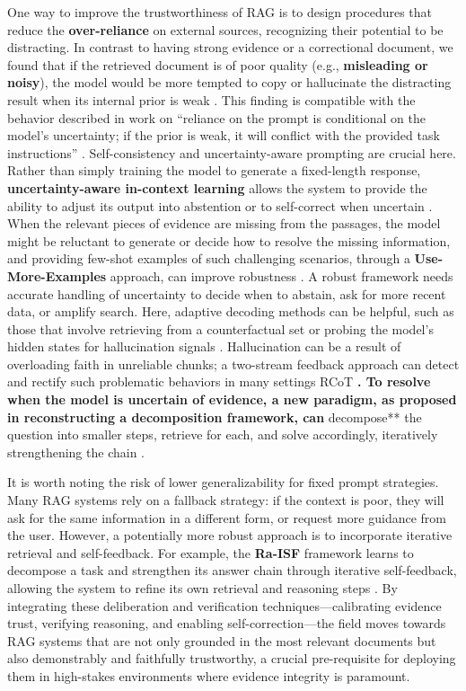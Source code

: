 \documentclass[11pt]{article}
\begin{document}
One way to improve the trustworthiness of RAG is to design procedures that reduce the \textbf{over-reliance} on external sources, recognizing their potential to be distracting. In contrast to having strong evidence or a correctional document, we found that if the retrieved document is of poor quality (e.g., \textbf{misleading or noisy}), the model would be more tempted to copy or hallucinate the distracting result when its internal prior is weak \cite{ref37}. This finding is compatible with the behavior described in work on ``reliance on the prompt is conditional on the model's uncertainty; if the prior is weak, it will conflict with the provided task instructions'' \cite{ref15}. Self-consistency and uncertainty-aware prompting are crucial here. Rather than simply training the model to generate a fixed-length response, \textbf{uncertainty-aware in-context learning} allows the system to provide the ability to adjust its output into abstention or to self-correct when uncertain \cite{ref192}. When the relevant pieces of evidence are missing from the passages, the model might be reluctant to generate or decide how to resolve the missing information, and providing few-shot examples of such challenging scenarios, through a \textbf{Use-More-Examples} approach, can improve robustness \cite{ref193}. A robust framework needs accurate handling of uncertainty to decide when to abstain, ask for more recent data, or amplify search. Here, adaptive decoding methods can be helpful, such as those that involve retrieving from a counterfactual set or probing the model's hidden states for hallucination signals \cite{ref194}. Hallucination can be a result of overloading faith in unreliable chunks; a two-stream feedback approach can detect and rectify such problematic behaviors in many settings RCoT \cite{ref195}\textbf{. To resolve when the model is uncertain of evidence, a new paradigm, as proposed in reconstructing a decomposition framework, can }decompose** the question into smaller steps, retrieve for each, and solve accordingly, iteratively strengthening the chain \cite{ref196}.

It is worth noting the risk of lower generalizability for fixed prompt strategies. Many RAG systems rely on a fallback strategy: if the context is poor, they will ask for the same information in a different form, or request more guidance from the user. However, a potentially more robust approach is to incorporate iterative retrieval and self-feedback. For example, the \textbf{Ra-ISF} framework learns to decompose a task and strengthen its answer chain through iterative self-feedback, allowing the system to refine its own retrieval and reasoning steps \cite{ref42}. By integrating these deliberation and verification techniques---calibrating evidence trust, verifying reasoning, and enabling self-correction---the field moves towards RAG systems that are not only grounded in the most relevant documents but also demonstrably and faithfully trustworthy, a crucial pre-requisite for deploying them in high-stakes environments where evidence integrity is paramount.
\end{document}
